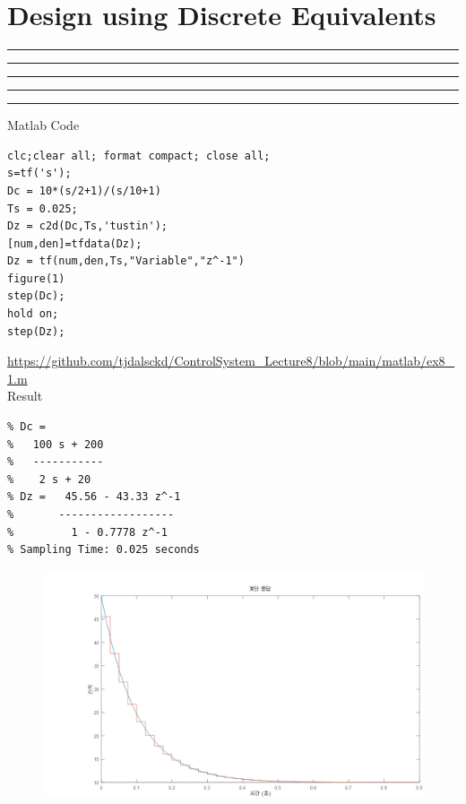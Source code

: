 \setcounter{chapter}{7}
\setcounter{section}{2}
\section{Design using Discrete Equivalents}
\vspace{-8pt} \hrule \hrule \hrule \hrule \hrule  \vspace{12pt}
Matlab Code
\begin{lstlisting}
clc;clear all; format compact; close all;
s=tf('s');
Dc = 10*(s/2+1)/(s/10+1)
Ts = 0.025;
Dz = c2d(Dc,Ts,'tustin');
[num,den]=tfdata(Dz);
Dz = tf(num,den,Ts,"Variable","z^-1")
figure(1)
step(Dc);
hold on;
step(Dz);
\end{lstlisting}
\url{https://github.com/tjdalsckd/ControlSystem_Lecture8/blob/main/matlab/ex8_1.m}\\
Result
\begin{lstlisting}
% Dc =
%   100 s + 200
%   -----------
%    2 s + 20
% Dz =   45.56 - 43.33 z^-1
%       ------------------
%         1 - 0.7778 z^-1
% Sampling Time: 0.025 seconds
\end{lstlisting}
\newpage
\begin{figure}[h]
	\centering
	\includegraphics[width=24cm]{./FIG_Franklin/fig8-smc6.png}
\end{figure}
